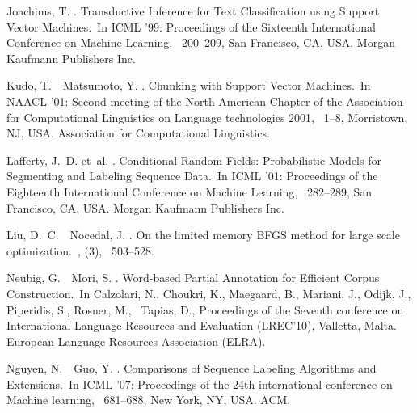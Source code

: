 \documentclass[english]{jnlp_JS2.0}
\begin{document}
\begin{thebibliography}{}
Joachims, T. \BBCP.
\newblock \BBOQ Transductive Inference for Text Classification using Support
  Vector Machines.\BBCQ\
\newblock In {\Bem ICML '99: Proceedings of the Sixteenth International
  Conference on Machine Learning}, \mbox{\BPGS\ 200--209}, San Francisco, CA,
  USA. Morgan Kaufmann Publishers Inc.

Kudo, T.\BBACOMMA\ \BBA\ Matsumoto, Y. \BBOP 2001\BBCP.
\newblock \BBOQ Chunking with Support Vector Machines.\BBCQ\
\newblock In {\Bem NAACL '01: Second meeting of the North American Chapter of
  the Association for Computational Linguistics on Language technologies 2001},
  \mbox{\BPGS\ 1--8}, Morristown, NJ, USA. Association for Computational
  Linguistics.

Lafferty, J.~D. et~al. \BBCP.
\newblock \BBOQ Conditional Random Fields: Probabilistic Models for Segmenting
  and Labeling Sequence Data.\BBCQ\
\newblock In {\Bem ICML '01: Proceedings of the Eighteenth International
  Conference on Machine Learning}, \mbox{\BPGS\ 282--289}, San Francisco, CA,
  USA. Morgan Kaufmann Publishers Inc.

Liu, D.~C.\BBACOMMA\ \BBA\ Nocedal, J. \BBOP 1989\BBCP.
\newblock \BBOQ On the limited memory BFGS method for large scale
  optimization.\BBCQ\
, {}  (3), \mbox{\BPGS\ 503--528}.

Neubig, G.\BBACOMMA\ \BBA\ Mori, S. \BBOP 2010\BBCP.
\newblock \BBOQ Word-based Partial Annotation for Efficient Corpus
  Construction.\BBCQ\
\newblock In Calzolari, N., Choukri, K., Maegaard, B., Mariani, J., Odijk, J.,
  Piperidis, S., Rosner, M., \BBA\ Tapias, D.\BEDS, {\Bem Proceedings of the
  Seventh conference on International Language Resources and Evaluation
  (LREC'10)}, Valletta, Malta. European Language Resources Association (ELRA).

Nguyen, N.\BBACOMMA\ \BBA\ Guo, Y. \BBOP 2007\BBCP.
\newblock \BBOQ Comparisons of Sequence Labeling Algorithms and
  Extensions.\BBCQ\
\newblock In {\Bem ICML '07: Proceedings of the 24th international conference
  on Machine learning}, \mbox{\BPGS\ 681--688}, New York, NY, USA. ACM.


\end{thebibliography}
\end{document}
